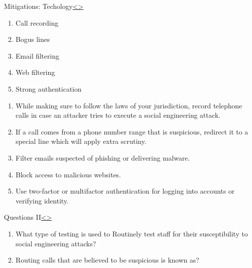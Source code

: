 \documentclass[12pt]{extarticle}
\newenvironment{instructionblock}{\Large\bgroup}{\egroup}
\begin{document}
\pagebreak
\begin{slide}{Mitigations: Techology}{\hyperref[slide 20]{\textless}\hyperref[slide 22]{\textgreater}}
\vskip 5pt
\begin{instructionblock}
	\begin{enumerate}
		\item Call recording
		\item Bogus lines
		\item Email filtering
		\item Web filtering
		\item Strong authentication
   \end{enumerate}
\end{instructionblock}
\end{slide}
\begin{enumerate}
	\item While making sure to follow the laws of your jurisdiction, record telephone calls in case an attacker tries to execute a social engineering attack.\cite{b2}
	\item If a call comes from a phone number range that is suspicious, redirect it to a special line which will apply extra scrutiny.\cite{b2}
	\item Filter emails suspected of phishing or delivering malware.\cite{b2}
	\item Block access to malicious websites.\cite{b2}
	\item Use two-factor or multifactor authentication for logging into accounts or verifying identity.\cite{b2}
	
\end{enumerate}

\pagebreak
\begin{slide}{Questions II}{\hyperref[slide 21]{\textless}\hyperref[slide 23]{\textgreater}}
\vskip 5pt
\begin{instructionblock}
	\begin{enumerate}
	\item What type of testing is used to Routinely test staff for their susceptibility to social engineering attacks?
	\item Routing calls that are believed to be suspicious is known as?
	\end{enumerate}

\end{instructionblock}
\end{slide}
\vfill
\end{document}
